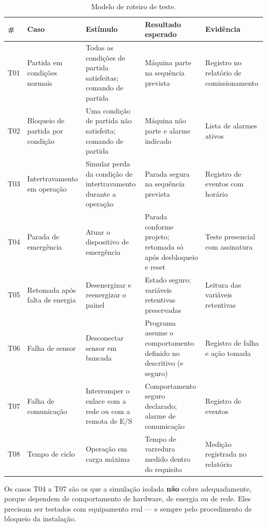 \begin{table}[H]
  \centering
  \caption{Modelo de roteiro de teste.}
  \label{tab:roteiro-teste}
  \begin{tabular}{p{1.0cm} p{3.4cm} p{3.6cm} p{3.4cm} p{2.6cm}}
    \toprule
    \# & Caso & Estímulo & Resultado esperado & Evidência \\
    \midrule
    T01 & Partida em condições normais
      & Todas as condições de partida satisfeitas; comando de partida
      & Máquina parte na sequência prevista
      & Registro no relatório de comissionamento \\
    T02 & Bloqueio de partida por condição
      & Uma condição de partida não satisfeita; comando de partida
      & Máquina não parte e alarme indicado
      & Lista de alarmes ativos \\
    T03 & Intertravamento em operação
      & Simular perda da condição de intertravamento durante a operação
      & Parada segura na sequência prevista
      & Registro de eventos com horário \\
    T04 & Parada de emergência
      & Atuar o dispositivo de emergência
      & Parada conforme projeto; retomada só após desbloqueio e reset
      & Teste presencial com assinatura \\
    T05 & Retomada após falta de energia
      & Desenergizar e reenergizar o painel
      & Estado seguro; variáveis retentivas preservadas
      & Leitura das variáveis retentivas \\
    T06 & Falha de sensor
      & Desconectar sensor em bancada
      & Programa assume o comportamento definido no descritivo (e seguro)
      & Registro de falha e ação tomada \\
    T07 & Falha de comunicação
      & Interromper o enlace com a rede ou com a remota de E/S
      & Comportamento seguro declarado; alarme de comunicação
      & Registro de eventos \\
    T08 & Tempo de ciclo
      & Operação em carga máxima
      & Tempo de varredura medido dentro do requisito
      & Medição registrada no relatório \\
    \bottomrule
  \end{tabular}
\end{table}

Os casos T04 a T07 são os que a simulação isolada \textbf{não} cobre adequadamente, porque dependem
de comportamento de hardware, de energia ou de rede. Eles precisam ser testados com equipamento real
--- e sempre pelo procedimento de bloqueio da instalação.

